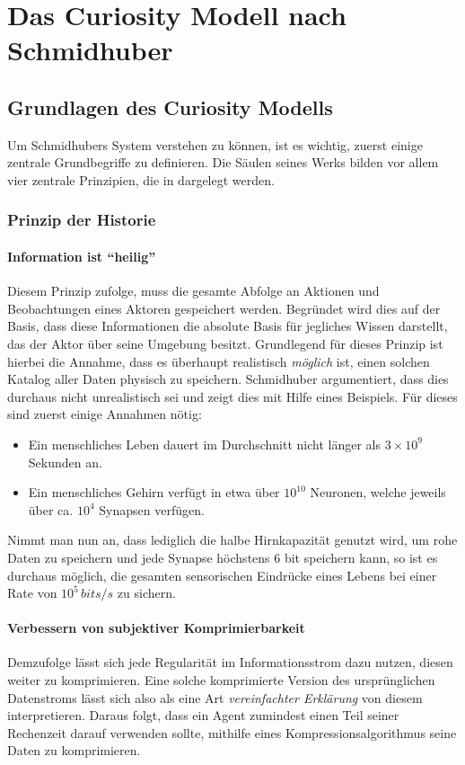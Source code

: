 
\section{Das Curiosity Modell nach Schmidhuber}
\label{sec:Curiosity_Schmidhuber}

\subsection{Grundlagen des Curiosity Modells}
Um Schmidhubers System verstehen zu können, ist es wichtig, zuerst einige zentrale Grundbegriffe zu definieren.
Die Säulen seines Werks bilden vor allem vier zentrale Prinzipien, die in  dargelegt werden.

\subsubsection{Prinzip der Historie}

\paragraph{Information ist ``heilig''}
\label{sec:Information_Heilig}
Diesem Prinzip zufolge, muss die gesamte Abfolge an Aktionen und Beobachtungen eines Aktoren gespeichert werden. Begründet wird dies auf der Basis, dass diese Informationen die absolute Basis für jegliches Wissen darstellt, das der Aktor über seine Umgebung besitzt. 
Grundlegend für dieses Prinzip ist hierbei die Annahme, dass es überhaupt realistisch \emph{möglich} ist, einen solchen Katalog aller Daten physisch zu speichern.
Schmidhuber argumentiert, dass dies durchaus nicht unrealistisch sei und zeigt dies mit Hilfe eines Beispiels. 
Für dieses sind zuerst einige Annahmen nötig: 
\begin{itemize}
    \item Ein menschliches Leben dauert im Durchschnitt nicht länger als \(3\times10^9\) Sekunden an.
    \item Ein menschliches Gehirn verfügt in etwa über \(10^{10}\) Neuronen, welche jeweils über ca. \(10^{4}\) Synapsen verfügen.
\end{itemize}
Nimmt man nun an, dass lediglich die halbe Hirnkapazität genutzt wird, um rohe Daten zu speichern und jede Synapse höchstens 6 bit speichern kann, so ist es durchaus möglich, die gesamten sensorischen Eindrücke eines Lebens bei einer Rate von \(10^5\, bits/s\) zu sichern.

\paragraph{Verbessern von subjektiver Komprimierbarkeit}
\label{sec:Komprimierbarkeit_verbessern}
Demzufolge lässt sich jede Regularität im Informationsstrom dazu nutzen, diesen weiter zu komprimieren. Eine solche komprimierte Version des ursprünglichen Datenstroms lässt sich also als eine Art \emph{vereinfachter Erklärung} von diesem interpretieren. Daraus folgt, dass ein Agent zumindest einen Teil seiner Rechenzeit darauf verwenden sollte, mithilfe eines Kompressionsalgorithmus seine Daten zu komprimieren.

